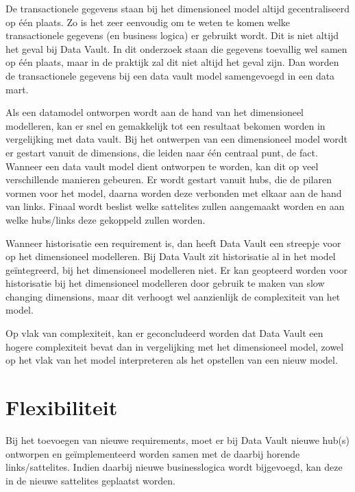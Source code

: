 De transactionele gegevens staan bij het dimensioneel model altijd gecentraliseerd op één plaats. Zo is het zeer eenvoudig om te weten te komen welke transactionele gegevens (en business logica) er gebruikt wordt. Dit is niet altijd het geval bij Data Vault. In dit onderzoek staan die gegevens toevallig wel samen op één plaats, maar in de praktijk zal dit niet altijd het geval zijn. Dan worden de transactionele gegevens bij een data vault model samengevoegd in een data mart.

Als een datamodel ontworpen wordt aan de hand van het dimensioneel modelleren, kan er snel en gemakkelijk tot een resultaat bekomen worden in vergelijking met data vault. Bij het ontwerpen van een dimensioneel model wordt er gestart vanuit de dimensions, die leiden naar één centraal punt, de fact. Wanneer een data vault model dient ontworpen te worden, kan dit op veel verschillende manieren gebeuren. Er wordt gestart vanuit hubs, die de pilaren vormen voor het model, daarna worden deze verbonden met elkaar aan de hand van links. Finaal wordt beslist welke sattelites zullen aangemaakt worden en aan welke hubs/links deze gekoppeld zullen worden.

Wanneer historisatie een requirement is, dan heeft Data Vault een streepje voor op het dimensioneel modelleren. Bij Data Vault zit historisatie al in het model geïntegreerd, bij het dimensioneel modelleren niet. Er kan geopteerd worden voor historisatie bij het dimensioneel modelleren door gebruik te maken van slow changing dimensions, maar dit verhoogt wel aanzienlijk de complexiteit van het model.

Op vlak van complexiteit, kan er geconcludeerd worden dat Data Vault een hogere complexiteit bevat dan in vergelijking met het dimensioneel model, zowel op het vlak van het model interpreteren als het opstellen van een nieuw model.

\section{Flexibiliteit}
Bij het toevoegen van nieuwe requirements, moet er bij Data Vault nieuwe hub(s) ontworpen en geïmplementeerd worden samen met de daarbij horende links/sattelites. Indien daarbij nieuwe businesslogica wordt bijgevoegd, kan deze in de nieuwe sattelites geplaatst worden. 

